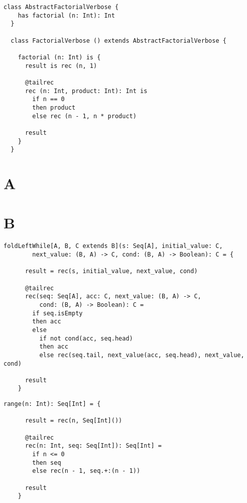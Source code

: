 \documentclass[12pt,a4paper]{book}
\begin{document}
    \begin{lstlisting}[label={lst:exampleFactorialVerbose}]
  class AbstractFactorialVerbose {
    has factorial (n: Int): Int
  }

  class FactorialVerbose () extends AbstractFactorialVerbose {

    factorial (n: Int) is {
      result is rec (n, 1)

      @tailrec
      rec (n: Int, product: Int): Int is
        if n == 0
        then product
        else rec (n - 1, n * product)

      result
    }
  }
    \end{lstlisting}

    \appendix

    \chapter{A}

    

    \chapter{B}

    \begin{lstlisting}[label={lst:foldLeftWhile}]
    foldLeftWhile[A, B, C extends B](s: Seq[A], initial_value: C,
        next_value: (B, A) -> C, cond: (B, A) -> Boolean): C = {

      result = rec(s, initial_value, next_value, cond)

      @tailrec
      rec(seq: Seq[A], acc: C, next_value: (B, A) -> C,
          cond: (B, A) -> Boolean): C =
        if seq.isEmpty
        then acc
        else
          if not cond(acc, seq.head)
          then acc
          else rec(seq.tail, next_value(acc, seq.head), next_value, cond)

      result
    }
    \end{lstlisting}

    \begin{lstlisting}[label={lst:range}]
    range(n: Int): Seq[Int] = {

      result = rec(n, Seq[Int]())

      @tailrec
      rec(n: Int, seq: Seq[Int]): Seq[Int] =
        if n <= 0
        then seq
        else rec(n - 1, seq.+:(n - 1))

      result
    }
    \end{lstlisting}
\end{document}
